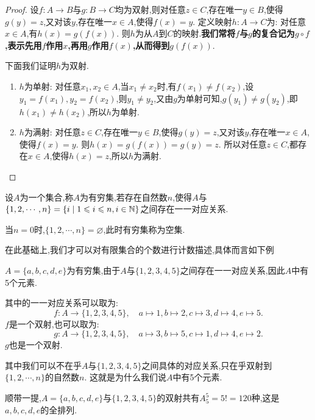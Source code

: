 \begin{proof}
    设$f:A\to B$与$g:B\to C$均为双射,则对任意$z\in C$,存在唯一$y\in B$,使得$g(y)=z$,又对该$y$,存在唯一$x\in A$,使得$f(x)=y$. 定义映射$h:A\to C$为: 对任意$x\in A$,有$h(x)=g(f(x))$. 则$h$为从$A$到$C$的映射.\textbf{我们常将$f$与$g$的复合记为$g\circ f$,表示先用$f$作用$x$,再用$g$作用$f(x)$,从而得到$g(f(x))$}.

    下面我们证明$h$为双射.

    \begin{enumerate}[(1)]
        \item $h$为单射: 对任意$x_1,x_2\in A$,当$x_1\neq x_2$时,有$f(x_1)\neq f(x_2)$,设$y_1=f(x_1),y_2=f(x_2)$,则$y_1\neq y_2$,又由$g$为单射可知,$g(y_1)\neq g(y_2)$,即$h(x_1)\neq h(x_2)$,所以$h$为单射.
        \item $h$为满射: 对任意$z\in C$,存在唯一$y\in B$,使得$g(y)=z$,又对该$y$,存在唯一$x\in A$,使得$f(x)=y$. 则$h(x)=g(f(x))=g(y)=z$. 所以对任意$z\in C$,都存在$x\in A$,使得$h(x)=z$,所以$h$为满射.
    \end{enumerate}

\end{proof}

\begin{definition}[有穷集]\label{1.1.def:finiteset}
    设$A$为一个集合,称$A$为有穷集,若存在自然数$n$,使得$A$与$\{1,2,\cdots,n\} = \{ i \mid 1 \leqslant i \leqslant n , i \in \mathbb{N}\}$之间存在一一对应关系.

    当$n=0$时,$\{1,2,\cdots,n\}=\varnothing$,此时有穷集称为空集.
\end{definition}

在此基础上,我们才可以对有限集合的个数进行计数描述,具体而言如下例
\begin{example}
    $A = \{ a,b,c,d,e \}$为有穷集,由于$A$与$\{1,2,3,4,5\}$之间存在一一对应关系,因此$A$中有5个元素.

    其中的一一对应关系可以取为:
    $$f: A \to \{1,2,3,4,5\}, \quad a \mapsto 1, b \mapsto 2, c \mapsto 3, d \mapsto 4, e \mapsto 5.$$
    $f$是一个双射,也可以取为:
    $$g: A \to \{1,2,3,4,5\}, \quad a \mapsto 3, b \mapsto 5, c \mapsto 1, d \mapsto 4, e \mapsto 2.$$
    $g$也是一个双射.

    其中我们可以不在乎$A$与$\{1,2,3,4,5\}$之间具体的对应关系,只在乎双射到$\{1,2,\cdots,n\}$的自然数$n$. 这就是为什么我们说$A$中有5个元素.

    顺带一提,$A = \{ a,b,c,d,e \} $与$\{1,2,3,4,5\}$的双射共有$A_5^5=5!=120$种,这是$a,b,c,d,e$的全排列.
\end{example}

